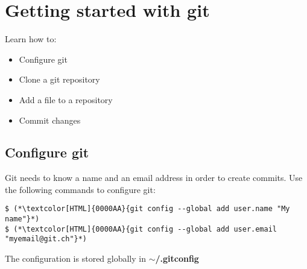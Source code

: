 \section{Getting started with git}
\begin{frame}[fragile]
  \slidetitle

  Learn how to:
  \begin{itemize}
    \item Configure git
    \item Clone a git repository
    \item Add a file to a repository
    \item Commit changes
  \end{itemize}
\end{frame}

\subsection{Configure git}
\begin{frame}[fragile]
  \subslidetitle
  Git needs to know a name and an email address in order to create commits.
  \vspace{1em}
  Use the following commands to configure git:
  \begin{lstlisting}
$ (*\textcolor[HTML]{0000AA}{git config --global add user.name "My name"}*)
$ (*\textcolor[HTML]{0000AA}{git config --global add user.email "myemail@git.ch"}*)
  \end{lstlisting}

  The configuration is stored globally in \bf{$\sim$/.gitconfig}
\end{frame}

